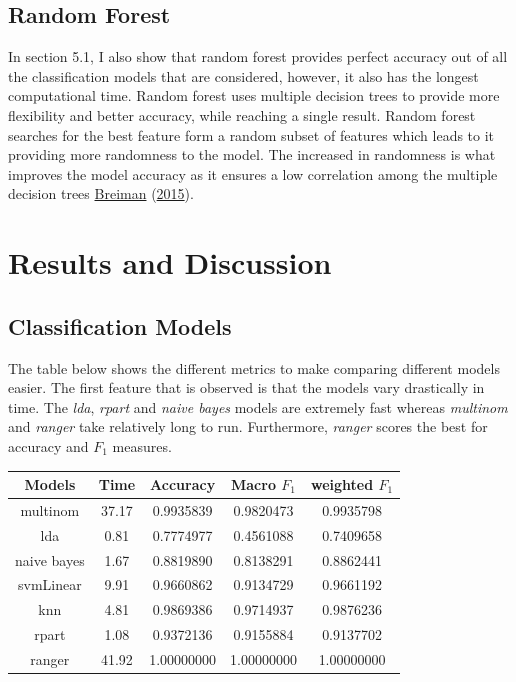 \documentclass[11pt,preprint, authoryear]{elsarticle}
\numberwithin{equation}{section}
\numberwithin{figure}{section}
\numberwithin{table}{section}
\begin{document}
\hypertarget{random-forest}{%
\subsection{Random Forest}\label{random-forest}}

In section 5.1, I also show that random forest provides perfect accuracy
out of all the classification models that are considered, however, it
also has the longest computational time. Random forest uses multiple
decision trees to provide more flexibility and better accuracy, while
reaching a single result. Random forest searches for the best feature
form a random subset of features which leads to it providing more
randomness to the model. The increased in randomness is what improves
the model accuracy as it ensures a low correlation among the multiple
decision trees \protect\hyperlink{ref-breiman2015random}{Breiman}
(\protect\hyperlink{ref-breiman2015random}{2015}).

\hypertarget{results-and-discussion}{%
\section{Results and Discussion}\label{results-and-discussion}}

\hypertarget{classification-models}{%
\subsection{Classification Models}\label{classification-models}}

The table below shows the different metrics to make comparing different
models easier. The first feature that is observed is that the models
vary drastically in time. The \emph{lda}, \emph{rpart} and
\emph{naive bayes} models are extremely fast whereas \emph{multinom} and
\emph{ranger} take relatively long to run. Furthermore, \emph{ranger}
scores the best for accuracy and \(F_1\) measures.

\begin{center}
\begin{tabular}{| c| c| c |c| c|}
\hline
\textbf{Models} & \textbf{Time} & \textbf{Accuracy} & \textbf{Macro \(F_1\)} & \textbf{weighted \(F_1\)} \\
\hline
multinom & 37.17 & 0.9935839 & 0.9820473 & 0.9935798 \\
\hline
lda & 0.81 & 0.7774977 & 0.4561088 & 0.7409658 \\
\hline
naive bayes & 1.67 & 0.8819890 & 0.8138291 & 0.8862441 \\
\hline
svmLinear & 9.91 & 0.9660862 & 0.9134729 & 0.9661192 \\
\hline
knn & 4.81 & 0.9869386 & 0.9714937 & 0.9876236 \\
\hline 
rpart & 1.08 & 0.9372136 & 0.9155884 & 0.9137702 \\
\hline 
ranger & 41.92 & 1.00000000 & 1.00000000 & 1.00000000 \\
\hline
\end{tabular}
\end{center}
\end{document}

